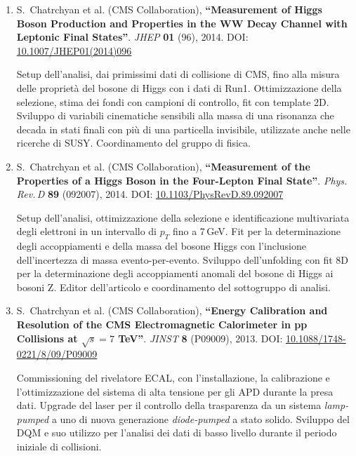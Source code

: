 \documentclass[11pt,twoside,a4paper]{article}
\begin{document}
\begin{enumerate}
\item S.~Chatrchyan et al. (CMS Collaboration), \textbf{``Measurement
  of Higgs Boson Production and Properties in the WW Decay Channel
  with Leptonic Final States''}. \textit{JHEP} \textbf{01} (96),
  2014. DOI:
  \href{https://link.springer.com/article/10.1007/JHEP01(2014)096}{10.1007/JHEP01(2014)096}

  Setup dell'analisi, dai primissimi dati di collisione di CMS, fino
  alla misura delle propriet\`a del bosone di Higgs con i dati di
  Run1. Ottimizzazione della selezione, stima dei fondi con campioni
  di controllo, fit con template 2D. Sviluppo di variabili cinematiche
  sensibili alla massa di una risonanza che decada in stati finali con
  pi\`u di una particella invisibile, utilizzate anche nelle ricerche
  di SUSY. Coordinamento del gruppo di fisica.

\item S.~Chatrchyan et al. (CMS Collaboration), \textbf{``Measurement of the
  Properties of a Higgs Boson in the Four-Lepton Final State''}.
  \textit{Phys.\,Rev.\,D} \textbf{89} (092007), 2014. DOI:
  \href{https://journals.aps.org/prd/abstract/10.1103/PhysRevD.89.092007}{10.1103/PhysRevD.89.092007}

  Setup dell'analisi, ottimizzazione della selezione e identificazione
  multivariata degli elettroni in un intervallo di $p_T$ fino a
  7\,GeV. Fit per la determinazione degli accoppiamenti e della massa
  del bosone Higgs con l'inclusione dell'incertezza di massa
  evento-per-evento. Sviluppo dell'unfolding con fit 8D per la
  determinazione degli accoppiamenti anomali del bosone di Higgs ai
  bosoni Z. Editor dell'articolo e coordinamento del sottogruppo
  di analisi.
  
\item S.~Chatrchyan et al. (CMS Collaboration), \textbf{``Energy
  Calibration and Resolution of the CMS Electromagnetic Calorimeter in
  pp Collisions at $\sqrt{s} = 7$ TeV''}. \textit{JINST} \textbf{8}
  (P09009), 2013. DOI:
  \href{https://iopscience.iop.org/article/10.1088/1748-0221/8/09/P09009/meta}{10.1088/1748-0221/8/09/P09009}

  Commissioning del rivelatore ECAL, con l'installazione, la
  calibrazione e l'ottimizzazione del sistema di alta tensione per gli
  APD durante la presa dati. Upgrade del laser per il controllo della
  trasparenza da un sistema \textit{lamp-pumped} a uno di nuova
  generazione \textit{diode-pumped} a stato solido. Sviluppo del DQM e
  suo utilizzo per l'analisi dei dati di basso livello durante il
  periodo iniziale di collisioni.


\end{enumerate}
\end{document}
